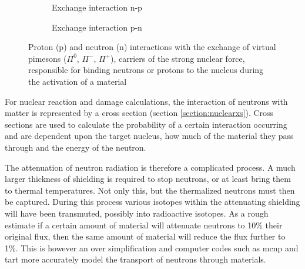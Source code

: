 \begin{figure}[htb]
\begin{subfigure}{.32\textwidth}
\centering
{}
\caption{Exchange interaction n-p\cite{pionexchange}}
\label{fig:pppion}
\end{subfigure}
\begin{subfigure}{.32\textwidth}
\centering
{}
\caption{Exchange interaction p-n\cite{pionexchange}}
\label{fig:pnpion}
\end{subfigure}
\caption{Proton (p) and neutron (n) interactions with the exchange of virtual \gls{pimesons} ($\Pi^{0}$, $\Pi^{-}$, $\Pi^{+}$), carriers of the strong nuclear force, responsible for binding neutrons or protons to the nucleus during the activation of a material}
\label{fig:pninteractions}
\end{figure}

For nuclear reaction and damage calculations, the interaction of neutrons with matter is represented by a cross section (section \ref{section:nuclearxs}).  Cross sections are used to calculate the probability of a certain interaction occurring and are dependent upon the target nucleus, how much of the material they pass through and the energy of the neutron.

The attenuation of neutron radiation is therefore a complicated process.  A much larger thickness of shielding is required to stop neutrons, or at least bring them to thermal temperatures.  Not only this, but the thermalized neutrons must then be captured.  During this process various isotopes within the attenuating shielding will have been transmuted, possibly into radioactive isotopes.  As a rough estimate if a certain amount of material will attenuate neutrons to 10\% their original flux, then the same amount of material will reduce the flux further to 1\%.  This is however an over simplification and computer codes such as \acrfull{mcnp} and \gls{tart} more accurately model the transport of neutrons through materials. 



